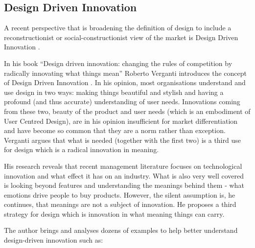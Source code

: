 		\subsection{Design Driven Innovation}

A recent perspective that is broadening the definition of design to include a reconstructionist \citep{chan2005blue} or social-constructionist \citep{Prahalad2000} view of the market is Design Driven Innovation \citep{Liem2011, verganti2013design}.   

In his book “Design driven innovation: changing the rules of competition by radically innovating what things mean” Roberto Verganti introduces the concept of Design Driven Innovation \citep{verganti2013design}. In his opinion, most organisations understand and use design in two ways: making things beautiful and stylish and having a profound (and thus accurate) understanding of user needs. Innovations coming from these two, beauty of the product and user needs (which is an embodiment of User Centred Design), are in his opinion insufficient for market differentiation and have become so common that they are a norm rather than exception. Verganti argues that what is needed (together with the first two) is a third use for design which is a radical innovation in meaning.

His research reveals that recent management literature focuses on technological innovation and what effect it has on an industry. What is also very well covered is looking beyond features and understanding the meanings behind them - what emotions drive people to buy products. However, the silent assumption is, he continues, that meanings are not a subject of innovation. He proposes a third strategy for design which is innovation in what meaning things can carry.

The author brings and analyses dozens of examples to help better understand design-driven innovation such as:

